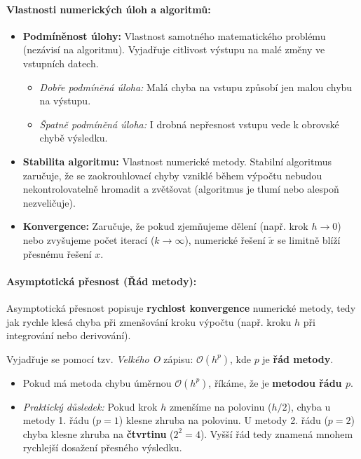 \paragraph*{Vlastnosti numerických úloh a algoritmů:}
\begin{itemize}
    \item \textbf{Podmíněnost úlohy:} Vlastnost samotného matematického problému (nezávisí na algoritmu). Vyjadřuje citlivost výstupu na malé změny ve vstupních datech. 
    \begin{itemize}
        \item \textit{Dobře podmíněná úloha:} Malá chyba na vstupu způsobí jen malou chybu na výstupu.
        \item \textit{Špatně podmíněná úloha:} I drobná nepřesnost vstupu vede k obrovské chybě výsledku.
    \end{itemize}
    \item \textbf{Stabilita algoritmu:} Vlastnost numerické metody. Stabilní algoritmus zaručuje, že se zaokrouhlovací chyby vzniklé během výpočtu nebudou nekontrolovatelně hromadit a zvětšovat (algoritmus je tlumí nebo alespoň nezveličuje).
    \item \textbf{Konvergence:} Zaručuje, že pokud zjemňujeme dělení (např. krok $h \to 0$) nebo zvyšujeme počet iterací ($k \to \infty$), numerické řešení $\tilde{x}$ se limitně blíží přesnému řešení $x$.
\end{itemize}

\paragraph*{Asymptotická přesnost (Řád metody):}
Asymptotická přesnost popisuje \textbf{rychlost konvergence} numerické metody, tedy jak rychle klesá chyba při zmenšování kroku výpočtu (např. kroku $h$ při integrování nebo derivování). 

Vyjadřuje se pomocí tzv. \textit{Velkého O} zápisu: $\mathcal{O}(h^p)$, kde $p$ je \textbf{řád metody}.
\begin{itemize}
    \item Pokud má metoda chybu úměrnou $\mathcal{O}(h^p)$, říkáme, že je \textbf{metodou řádu $p$}.
    \item \textit{Praktický důsledek:} Pokud krok $h$ zmenšíme na polovinu ($h/2$), chyba u metody 1. řádu ($p=1$) klesne zhruba na polovinu. U metody 2. řádu ($p=2$) chyba klesne zhruba na \textbf{čtvrtinu} ($2^2 = 4$). Vyšší řád tedy znamená mnohem rychlejší dosažení přesného výsledku.
\end{itemize}

